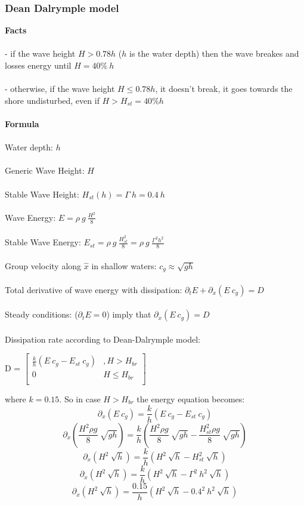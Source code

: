 \subsubsection{Dean Dalrymple model}
\textbf{Facts} \\ \\
- if the wave height $H > 0.78 h$ ($h$ is the water depth) then the wave breakes and losses energy until $H = 40 \% ~ h$\\ \\ 
- otherwise, if the wave height $H \le 0.78 h$, it doesn't break, it goes towards the shore undisturbed, even if $H > H_{st} = 40 \% h$\\ \\
\textbf{Formula} \\ \\
Water depth: $h$ \\ \\
Generic Wave Height: $H$ \\ \\
Stable Wave Height: $H_{st}(h) = \Gamma ~ h = 0.4 ~ h$ \\ \\ 
Wave Energy: $E = \rho ~ g ~ \frac{H^2} 8$ \\ \\
Stable Wave Energy: $E_{st} = \rho ~ g ~ \frac{H_{st}^2} 8 = \rho ~ g ~ \frac{ \Gamma^2  h^2} 8$ \\ \\
Group velocity along $\hat{x}$ in shallow waters: $c_g   \approx  \sqrt{g h}$ \\ \\
Total derivative of wave energy with dissipation: $\partial_t E + \partial_x(E ~ c_g) = D$   \\ \\ 
Steady conditions: ($\partial_t E = 0$) imply that
$\partial_x(E ~ c_g) = D$ \\ \\ 
Dissipation rate according to Dean-Dalrymple model:
\\
\begin{center}
D =  $\begin{bmatrix}
	\frac k h ( E ~ c_g - E_{st} ~ c_g) & , H > H_{br}\\
	0 & H \le H_{br}\\
  \end{bmatrix}$
\end{center}
where $k = 0.15$. So in case $ H > H_{br}$ the energy equation becomes:
\[
	\partial_x(E ~ c_g) = \frac k h ( E ~ c_g - E_{st} ~ c_g)
\]
\[
	\partial_x(\frac{H^2 \rho g} 8 ~ \sqrt{g h}) 
		= \frac k h ( \frac{H^2 \rho g} 8 ~ \sqrt{g h} 
				- \frac{H_{st}^2 \rho g} 8 ~ \sqrt{g h})
\]
\[
	\partial_x( H^2 ~ \sqrt{h}) 
		= \frac k h ( H^2 ~ \sqrt{h} 
				- H_{st}^2 ~ \sqrt{h})
\]
\[
	\partial_x( H^2 ~ \sqrt{h}) 
		= \frac k h ( H^2 ~ \sqrt{h} 
				- \Gamma^2 ~ h^2 ~ \sqrt{h})
\]
\[
	\partial_x( H^2 ~ \sqrt{h}) 
		= \frac {0.15} h ( H^2 ~ \sqrt{h} 
				- 0.4^2 ~ h^2 ~ \sqrt{h})
\]
